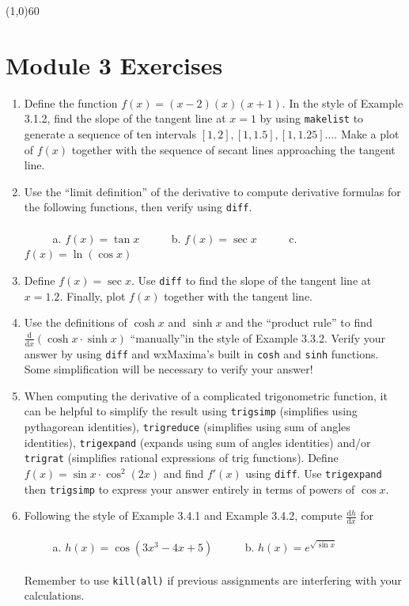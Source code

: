 \documentclass[10.5pt,twoside]{report}
\theoremstyle{definition}
\begin{document}
\line(1,0){60}
\linethickness{0.5mm}

\pagebreak


\section{Module 3 Exercises}\label{Module 3 Exercises}

\begin{enumerate}

\item Define the function $f(x)=(x-2)(x)(x+1)$.  In the style of Example 3.1.2, find the slope of the tangent line at $x=1$ by using \verb|makelist| to generate a sequence of ten intervals $[1,2],[1,1.5],[1,1.25]...$.  Make a plot of $f(x)$ together with the sequence of secant lines approaching the tangent line.
\item Use the ``limit definition'' of the derivative to compute derivative formulas for the following functions, then verify using \verb|diff|.\\
\verb|   |\\
\verb|     |a.  $f(x)=\tan{x}$ \verb|     |b.  $f(x)=\sec{x}$ \verb|     |c.  $f(x)=\ln{(\cos{x})}$
\item Define $f(x)=\sec{x}$.  Use \verb|diff| to find the slope of the tangent line at $x=1.2$.  Finally, plot $f(x)$ together with the tangent line.

\item Use the definitions of $\cosh{x}$ and $\sinh{x}$ and the ``product rule'' to find $\frac{\mathrm{d}}{\mathrm{d}x}(\cosh{x}\cdot \sinh{x})$ ``manually''in the style of Example 3.3.2. Verify your answer by using \verb|diff| and wxMaxima's built in \verb|cosh| and \verb|sinh| functions.  Some simplification will be necessary to verify your answer!

\item When computing the derivative of a complicated trigonometric function, it can be helpful to simplify the result using \verb|trigsimp| (simplifies using pythagorean identities), \verb|trigreduce| (simplifies using sum of angles identities), \verb|trigexpand| (expands using sum of angles identities) and/or \verb|trigrat| (simplifies rational expressions of trig functions).  Define $f(x)=\sin{x} \cdot \cos^{2}{(2x)}$ and find $f'(x)$ using \verb|diff|.  Use \verb|trigexpand| then \verb|trigsimp| to express your answer entirely in terms of powers of $\cos{x}$.

\item Following the style of Example 3.4.1 and Example 3.4.2, compute $\frac{\mathrm{d}h}{\mathrm{d}x}$ for \\
\verb|   |\\
\verb|     |a. $h(x)=\cos{(3x^3-4x+5)}$  \verb|     |b.  $h(x)=e^{\sqrt{\sin{x}}}$\\
\verb|   |\\
Remember to use \verb|kill(all)| if previous assignments are interfering with your calculations.


\end{enumerate}
\end{document}
